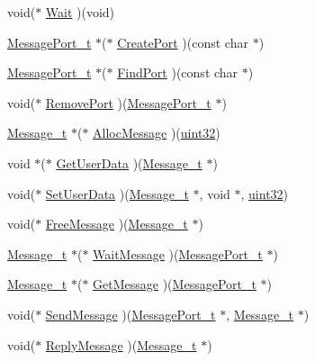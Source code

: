 \begin{DoxyCompactItemize}
\item 
void($\ast$ \hyperlink{structIExec__t_a04da5444df0680708bff66ed1dbea947}{Wait} )(void)
\item 
\hyperlink{structMessagePort__t}{Message\+Port\+\_\+t} $\ast$($\ast$ \hyperlink{structIExec__t_a06713fa4b58876173f3274f26a8ca943}{Create\+Port} )(const char $\ast$)
\item 
\hyperlink{structMessagePort__t}{Message\+Port\+\_\+t} $\ast$($\ast$ \hyperlink{structIExec__t_a9d511dd8847f1ceec03dc1f0cb6c4b71}{Find\+Port} )(const char $\ast$)
\item 
void($\ast$ \hyperlink{structIExec__t_a345b67e7a05a9e498716b6ea41586b61}{Remove\+Port} )(\hyperlink{structMessagePort__t}{Message\+Port\+\_\+t} $\ast$)
\item 
\hyperlink{structMessage__t}{Message\+\_\+t} $\ast$($\ast$ \hyperlink{structIExec__t_a6ed4cf5e735ccb663691c9a61018288c}{Alloc\+Message} )(\hyperlink{type_8h_acbd4acd0d29e2d6c43104827f77d9cd2}{uint32})
\item 
void $\ast$($\ast$ \hyperlink{structIExec__t_ad6581396da512a6631bfb6723df8c7db}{Get\+User\+Data} )(\hyperlink{structMessage__t}{Message\+\_\+t} $\ast$)
\item 
void($\ast$ \hyperlink{structIExec__t_a1de6bff504df7bec720d443453a4daab}{Set\+User\+Data} )(\hyperlink{structMessage__t}{Message\+\_\+t} $\ast$, void $\ast$, \hyperlink{type_8h_acbd4acd0d29e2d6c43104827f77d9cd2}{uint32})
\item 
void($\ast$ \hyperlink{structIExec__t_a6335ee31b358918963bddf93bb5ce256}{Free\+Message} )(\hyperlink{structMessage__t}{Message\+\_\+t} $\ast$)
\item 
\hyperlink{structMessage__t}{Message\+\_\+t} $\ast$($\ast$ \hyperlink{structIExec__t_aea77ea019cf4cffc6fb92f97c2d2eab9}{Wait\+Message} )(\hyperlink{structMessagePort__t}{Message\+Port\+\_\+t} $\ast$)
\item 
\hyperlink{structMessage__t}{Message\+\_\+t} $\ast$($\ast$ \hyperlink{structIExec__t_a1a5170656236c15f6fe0302a6de9eb51}{Get\+Message} )(\hyperlink{structMessagePort__t}{Message\+Port\+\_\+t} $\ast$)
\item 
void($\ast$ \hyperlink{structIExec__t_a6f64a8bc0fbc09f77650bd8281040d1d}{Send\+Message} )(\hyperlink{structMessagePort__t}{Message\+Port\+\_\+t} $\ast$, \hyperlink{structMessage__t}{Message\+\_\+t} $\ast$)
\item 
void($\ast$ \hyperlink{structIExec__t_a2caebccfdf0bf902e5dc29a11907366f}{Reply\+Message} )(\hyperlink{structMessage__t}{Message\+\_\+t} $\ast$)
\item 

\end{DoxyCompactItemize}
